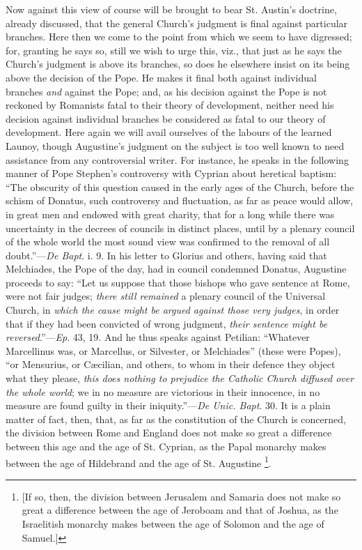 Now against this view of course will be brought
to bear St. Austin's doctrine, already discussed, that the general
Church's judgment is final against particular branches. Here then we
come to the point from which we seem to have digressed; for, granting
he says so, still we wish to urge this, viz., that just as he says the
Church's judgment is above its branches, so does he elsewhere insist
on its being above the decision of the Pope. He makes it final both
against individual branches \emph{and} against the Pope; and, as his decision
against the Pope is not reckoned by Romanists fatal to their theory of
development, neither need his decision against individual branches be
considered as fatal to our theory of development. Here again we will
avail ourselves of the labours of the learned Launoy, though
Augustine's judgment on the subject is too well known to need
assistance from any controversial writer. For instance, he speaks in
the following manner of Pope Stephen's controversy with Cyprian
about heretical baptism: ``The obscurity of this question caused in the early ages of the Church, before the schism of Donatus, such
controversy and fluctuation, as far as peace would allow, in great men
and endowed with great charity, that for a long while there was
uncertainty in the decrees of councils in distinct places, until by a
plenary council of the whole world the most sound view was confirmed
to the removal of all doubt.''—\emph{De Bapt}. i. 9. In his letter
to Glorius and others, having said that Melchiades, the Pope of the
day, had in council condemned Donatus, Augustine proceeds to say: ``Let us suppose that those bishops who gave sentence at Rome, were
not fair judges; \emph{there still remained} a plenary council of the
Universal Church, in \emph{which the cause might be argued against those
very judges}, in order that if they had been convicted of wrong
judgment, \emph{their sentence might be reversed}.''—\emph{Ep}. 43,
19. And he thus speaks against Petilian: ``Whatever Marcellinus was,
or Marcellus, or Silvester, or Melchiades'' (these were Popes), ``or
Mensurius, or Cæcilian, and others, to whom in their defence they
object what they please, \emph{this does nothing to prejudice the
Catholic Church diffused over the whole world}; we in no measure
are victorious in their innocence, in no measure are found guilty in
their iniquity.''—\emph{De Unic. Bapt}. 30. It is a plain matter of
fact, then, that, as far as the constitution of the Church is
concerned, the division between Rome and England does not make so
great a difference between this age and the age of St. Cyprian, as the
Papal monarchy makes between the age of Hildebrand and the age of St.
Augustine \footnote{[If so, then, the division between Jerusalem
and Samaria does not make so great a difference between the age of
Jeroboam and that of Joshua, as the Israelitish monarchy makes between
the age of Solomon and the age of Samuel.]}.


